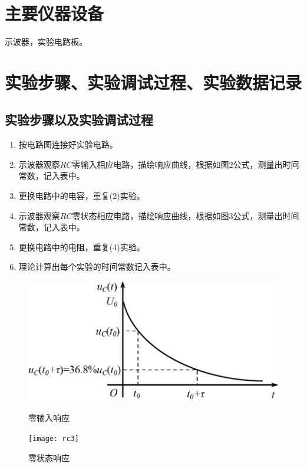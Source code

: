 \documentclass{../source/Experiment}
\begin{document}
    \section{主要仪器设备}
            示波器，实验电路板。
    \section{实验步骤、实验调试过程、实验数据记录}
        \subsection{实验步骤以及实验调试过程}
            \begin{enumerate}
                \item 按电路图连接好实验电路。
                \item 示波器观察$RC$零输入相应电路，描绘响应曲线，根据如图2公式，测量出时间常数，记入表中。
                \item 更换电路中的电容，重复(2)实验。
                \item 示波器观察$RC$零状态相应电路，描绘响应曲线，根据如图3公式，测量出时间常数，记入表中。
                \item 更换电路中的电阻，重复(4)实验。
                \item 理论计算出每个实验的时间常数记入表中。
            \end{enumerate}
            \begin{figure}[htbp]          
                \begin{minipage}[t]{0.5\textwidth}
                    \centering
                    \includegraphics[scale=0.8]{pic/rc2.png}
                    \caption{零输入响应}
                \end{minipage}
                \qquad
                \begin{minipage}[t]{0.5\textwidth}
                    \centering
                    \texttt{[image: rc3]}
                    \caption{零状态响应}
                \end{minipage}
            \end{figure}
\end{document}
